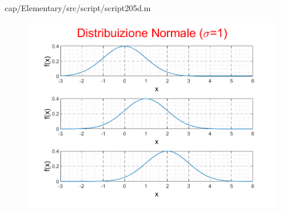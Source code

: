 
{cap/Elementary/src/script/script205d.m}
\begin{figure}[h]
    \centering
    \includegraphics{cap/Elementary/img/script205d}
    \label{fig:plotscript205d}
\end{figure}